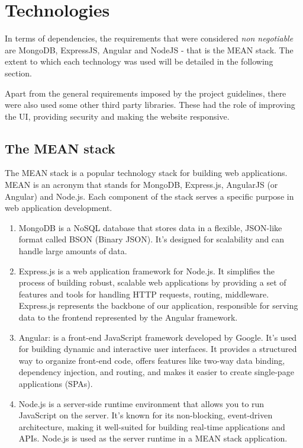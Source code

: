 \documentclass[multi, tikz, a4paper, oneside]{article}
\begin{document}
\section{Technologies}
In terms of dependencies, the requirements that were considered {\em{non
    negotiable}} are MongoDB, ExpressJS, Angular and NodeJS - that is the MEAN
stack. The extent to which each technology was used will be detailed in the
following section.

Apart from the general requirements imposed by the project guidelines, there
were also used some other third party libraries. These had the role of improving
the UI, providing security and making the website responsive.


\subsection{The MEAN stack}

The MEAN stack is a popular technology stack for building web applications. MEAN
is an acronym that stands for MongoDB, Express.js, AngularJS (or Angular) and
Node.js. Each component of the stack serves a specific purpose in web
application development.

\begin{enumerate}
\item MongoDB is a NoSQL database that stores data in a flexible, JSON-like
  format called BSON (Binary JSON). It's designed for scalability and can handle
  large amounts of data.
\item Express.js is a web application framework for Node.js. It simplifies the
  process of building robust, scalable web applications by providing a set of
  features and tools for handling HTTP requests, routing, middleware. Express.js
  represents the backbone of our application, responsible for serving data to
  the frontend represented by the Angular framework.
\item Angular: is a front-end JavaScript framework developed by Google. It's
  used for building dynamic and interactive user interfaces. It provides a
  structured way to organize front-end code, offers features like two-way data
  binding, dependency injection, and routing, and makes it easier to create
  single-page applications (SPAs).
\item Node.js is a server-side runtime environment that allows you to run
  JavaScript on the server. It's known for its non-blocking, event-driven
  architecture, making it well-suited for building real-time applications and
  APIs. Node.js is used as the server runtime in a MEAN stack application.
\end{enumerate}
\end{document}
